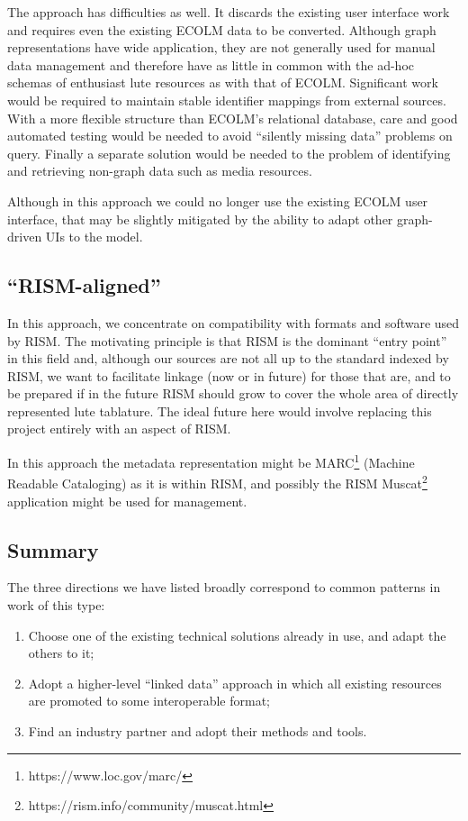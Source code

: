 \documentclass[sigconf]{acmart}
\begin{document}
\begin{sloppypar}
  The approach has difficulties as well. It discards the existing user
  interface work and requires even the existing ECOLM data to be
  converted. Although graph representations have wide application,
  they are not generally used for manual data management and therefore
  have as little in common with the ad-hoc schemas of enthusiast lute
  resources as with that of ECOLM. Significant work would be required
  to maintain stable identifier mappings from external sources. With a
  more flexible structure than ECOLM's relational database, care and
  good automated testing would be needed to avoid ``silently missing
  data'' problems on query. Finally a separate solution would be
  needed to the problem of identifying and retrieving non-graph data
  such as media resources.

  Although in this approach we could no longer use the existing ECOLM
  user interface, that may be slightly mitigated by the ability to
  adapt other graph-driven UIs to the model.
  
  \subsection{``RISM-aligned''}

  In this approach, we concentrate on compatibility with formats and
  software used by RISM. The motivating principle is that RISM is the
  dominant ``entry point'' in this field and, although our sources are
  not all up to the standard indexed by RISM, we want to facilitate
  linkage (now or in future) for those that are, and to be prepared if
  in the future RISM should grow to cover the whole area of directly
  represented lute tablature. The ideal future here would involve
  replacing this project entirely with an aspect of RISM.

  In this approach the metadata representation might be
  MARC\footnote{https://www.loc.gov/marc/} (Machine Readable
  Cataloging) as it is within RISM, and possibly the RISM
  Muscat\footnote{https://rism.info/community/muscat.html} application
  might be used for management.

  \subsection{Summary}

  The three directions we have listed broadly correspond to common
  patterns in work of this type:

  \begin{enumerate}
  \item Choose one of the existing technical solutions already in use,
    and adapt the others to it;
  \item Adopt a higher-level ``linked data'' approach in which all
    existing resources are promoted to some interoperable format;
  \item Find an industry partner and adopt their methods and tools.
  \end{enumerate}


\end{sloppypar}
\end{document}

